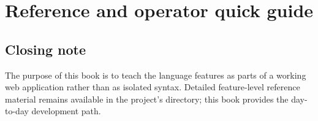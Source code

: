 \documentclass[11pt,a4paper,openany]{book}
\begin{document}
\part{Reference and operator quick guide}



\appendix

\backmatter
\chapter*{Closing note}
The purpose of this book is to teach the language features as parts of a working web application rather than as isolated syntax. Detailed feature-level reference material remains available in the project's  directory; this book provides the day-to-day development path.
\end{document}
